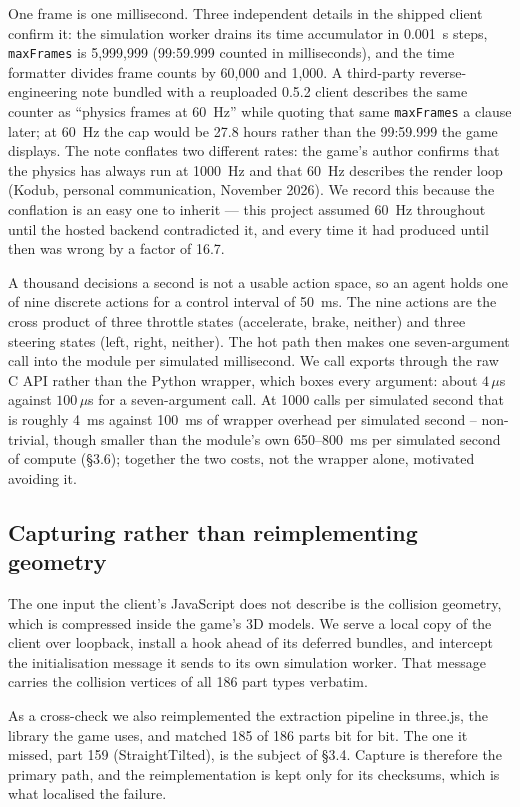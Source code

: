 \documentclass[11pt]{article}
\begin{document}
One frame is one millisecond. Three independent details in the shipped client confirm it: the simulation worker drains its time accumulator in 0.001~s steps, \texttt{maxFrames} is 5,999,999 (99:59.999 counted in milliseconds), and the time formatter divides frame counts by 60,000 and 1,000. A third-party reverse-engineering note bundled with a reuploaded 0.5.2 client describes the same counter as ``physics frames at 60~Hz'' while quoting that same \texttt{maxFrames} a clause later; at 60~Hz the cap would be 27.8 hours rather than the 99:59.999 the game displays. The note conflates two different rates: the game's author confirms that the physics has always run at 1000~Hz and that 60~Hz describes the render loop (Kodub, personal communication, November 2026). We record this because the conflation is an easy one to inherit --- this project assumed 60~Hz throughout until the hosted backend contradicted it, and every time it had produced until then was wrong by a factor of 16.7.

A thousand decisions a second is not a usable action space, so an agent holds one of nine discrete actions for a control interval of 50~ms. The nine actions are the cross product of three throttle states (accelerate, brake, neither) and three steering states (left, right, neither). The hot path then makes one seven-argument call into the module per simulated millisecond. We call exports through the raw C API rather than the Python wrapper, which boxes every argument: about $4\,\mu$s against $100\,\mu$s for a seven-argument call. At 1000 calls per simulated second that is roughly 4~ms against 100~ms of wrapper overhead per simulated second -- non-trivial, though smaller than the module's own 650--800~ms per simulated second of compute (\S3.6); together the two costs, not the wrapper alone, motivated avoiding it.

\subsection{Capturing rather than reimplementing geometry}

The one input the client's JavaScript does not describe is the collision geometry, which is compressed inside the game's 3D models. We serve a local copy of the client over loopback, install a hook ahead of its deferred bundles, and intercept the initialisation message it sends to its own simulation worker. That message carries the collision vertices of all 186 part types verbatim.

As a cross-check we also reimplemented the extraction pipeline in three.js, the library the game uses, and matched 185 of 186 parts bit for bit. The one it missed, part 159 (StraightTilted), is the subject of \S3.4. Capture is therefore the primary path, and the reimplementation is kept only for its checksums, which is what localised the failure.
\end{document}
